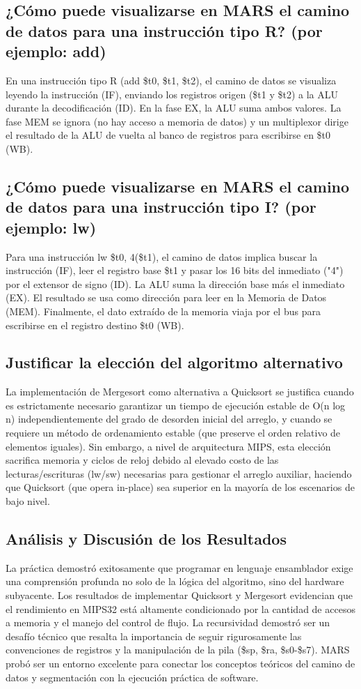 \documentclass[12pt, a4paper]{article}
\begin{document}
\subsection{¿Cómo puede visualizarse en MARS el camino de datos para una instrucción tipo R? (por ejemplo: add)}
    En una instrucción tipo R (add \$t0, \$t1, \$t2), el camino de datos se visualiza leyendo la instrucción (IF), enviando los registros origen (\$t1 y \$t2) a la ALU durante la decodificación (ID). En la fase EX, la ALU suma ambos valores. La fase MEM se ignora (no hay acceso a memoria de datos) y un multiplexor dirige el resultado de la ALU de vuelta al banco de registros para escribirse en \$t0 (WB).

\subsection{¿Cómo puede visualizarse en MARS el camino de datos para una instrucción tipo I? (por ejemplo: lw)}
    Para una instrucción lw \$t0, 4(\$t1), el camino de datos implica buscar la instrucción (IF), leer el registro base \$t1 y pasar los 16 bits del inmediato ("4") por el extensor de signo (ID). La ALU suma la dirección base más el inmediato (EX). El resultado se usa como dirección para leer en la Memoria de Datos (MEM). Finalmente, el dato extraído de la memoria viaja por el bus para escribirse en el registro destino \$t0 (WB).

\subsection{Justificar la elección del algoritmo alternativo}
    La implementación de Mergesort como alternativa a Quicksort se justifica cuando es estrictamente necesario garantizar un tiempo de ejecución estable de O(n log n) independientemente del grado de desorden inicial del arreglo, y cuando se requiere un método de ordenamiento estable (que preserve el orden relativo de elementos iguales). Sin embargo, a nivel de arquitectura MIPS, esta elección sacrifica memoria y ciclos de reloj debido al elevado costo de las lecturas/escrituras (lw/sw) necesarias para gestionar el arreglo auxiliar, haciendo que Quicksort (que opera in-place) sea superior en la mayoría de los escenarios de bajo nivel.

\subsection{ Análisis y Discusión de los Resultados}
    La práctica demostró exitosamente que programar en lenguaje ensamblador exige una comprensión profunda no solo de la lógica del algoritmo, sino del hardware subyacente. Los resultados de implementar Quicksort y Mergesort evidencian que el rendimiento en MIPS32 está altamente condicionado por la cantidad de accesos a memoria y el manejo del control de flujo. La recursividad demostró ser un desafío técnico que resalta la importancia de seguir rigurosamente las convenciones de registros y la manipulación de la pila (\$sp, \$ra, \$s0-\$s7). MARS probó ser un entorno excelente para conectar los conceptos teóricos del camino de datos y segmentación con la ejecución práctica de software.
\end{document}

